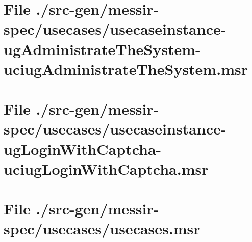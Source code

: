 \section[File /.../usecaseinstance-ugAdministrateTheSystem-uciugAdministrateTheSystem.msr]{File ./src-gen/messir-spec/usecases/usecaseinstance-ugAdministrateTheSystem-uciugAdministrateTheSystem.msr}
\scriptsize

\normalsize
	
\section[File /src-gen.../usecaseinstance-ugLoginWithCaptcha-uciugLoginWithCaptcha.msr]{File ./src-gen/messir-spec/usecases/usecaseinstance-ugLoginWithCaptcha-uciugLoginWithCaptcha.msr}
\scriptsize

\normalsize
	
\section[File /src-gen/messir-spec/usecases/usecases.msr]{File ./src-gen/messir-spec/usecases/usecases.msr}
\scriptsize

\normalsize
	
